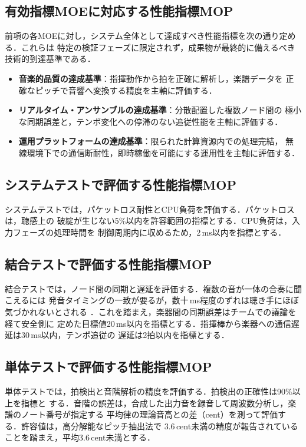 \documentclass[lualatex,book,paper=a4paper,jafontsize=11.5pt,jafontscale=1.05]{jlreq}
\begin{document}
\subsection{有効指標MOEに対応する性能指標MOP}
前項の各MOEに対し，システム全体として達成すべき性能指標を次の通り定める．これらは
特定の検証フェーズに限定されず，成果物が最終的に備えるべき技術的到達基準である．
\begin{itemize}
  \item \textbf{音楽的品質の達成基準}：指揮動作から拍を正確に解析し，楽譜データを
        正確なピッチで音響へ変換する精度を主軸に評価する．
  \item \textbf{リアルタイム・アンサンブルの達成基準}：分散配置した複数ノード間の
        極小な同期誤差と，テンポ変化への停滞のない追従性能を主軸に評価する．
  \item \textbf{運用プラットフォームの達成基準}：限られた計算資源内での処理完結，
        無線環境下での通信断耐性，即時稼働を可能にする運用性を主軸に評価する．
\end{itemize}

\subsection{システムテストで評価する性能指標MOP}
システムテストでは，パケットロス耐性とCPU負荷を評価する．パケットロスは，聴感上の
破綻が生じない5\%以内を許容範囲の指標とする．CPU負荷は，入力フェーズの処理時間を
制御周期内に収めるため，2\,ms以内を指標とする．

\subsection{結合テストで評価する性能指標MOP}
結合テストでは，ノード間の同期と遅延を評価する．複数の音が一体の合奏に聞こえるには
発音タイミングの一致が要るが，数十\,ms程度のずれは聴き手にほぼ気づかれないとされる
\cite{ref:douki}．これを踏まえ，楽器間の同期誤差はチームでの議論を経て安全側に
定めた目標値20\,ms以内を指標とする．指揮棒から楽器への通信遅延は30\,ms以内，テンポ追従の
遅延は2拍以内を指標とする．

\subsection{単体テストで評価する性能指標MOP}
単体テストでは，拍検出と音階解析の精度を評価する．拍検出の正確性は90\%以上を指標と
する．音階の誤差は，合成した出力音を録音して周波数分析し，楽譜のノート番号が指定する
平均律の理論音高との差（cent）を測って評価する．許容値は，高分解能なピッチ抽出法で
3.6\,cent未満の精度が報告されている\cite{ref:onkai}ことを踏まえ，平均3.6\,cent未満とする．
\end{document}
